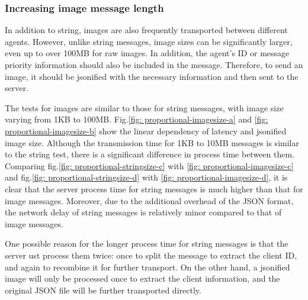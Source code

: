 \subsubsection{Increasing image message length}
In addition to string, images are also frequently transported between different agents. 
However, unlike string messages, image sizes can be significantly larger, even up to over 
100MB for raw images. In addition, the agent's ID or message priority information should 
also be included in the message. Therefore, to send an image, it should be jsonified with 
the necessary information and then sent to the server. 



The tests for images are similar to those for string messages, with image size varying 
from 1KB to 100MB. Fig.\ref{fig: proportional-imagesize-a} and \ref{fig: proportional-imagesize-b} 
show the linear dependency of latency and jsonified image size. Although the transmission 
time for 1KB to 10MB messages is similar to the string test, there is a significant 
difference in process time between them. Comparing fig.\ref{fig: proportional-stringsize-c} 
with \ref{fig: proportional-imagesize-c} and fig.\ref{fig: proportional-stringsize-d} 
with \ref{fig: proportional-imagesize-d}, it is clear that the server process time for 
string messages is much higher than that for image messages. Moreover, due to the 
additional overhead of the JSON format, the network delay of string messages is 
relatively minor compared to that of image messages. 




One possible reason for the longer process time for string messages is that the server 
ust process them twice: once to split the message to extract the client ID, and again 
to recombine it for further transport. On the other hand, a jsonified image will only 
be processed once to extract the client information, and the original JSON file will 
be further transported directly.



